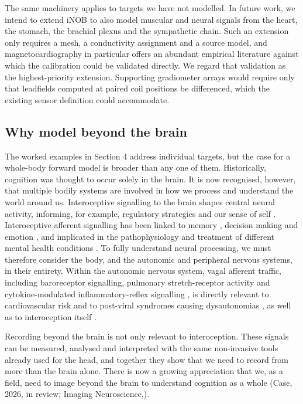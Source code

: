 \documentclass[11pt]{article}
\begin{document}
The same machinery applies to targets we have not modelled. In future
work, we intend to extend iNOB to also model muscular and neural signals
from the heart, the stomach, the brachial plexus and the sympathetic
chain. Such an extension only requires a mesh, a conductivity assignment
and a source model, and magnetocardiography in particular offers an
abundant empirical literature against which the calibration could be
validated directly. We regard that validation as the highest-priority
extension. Supporting gradiometer arrays would require only that
leadfields computed at paired coil positions be differenced, which the
existing sensor definition could accommodate.

\subsection{Why model beyond the
brain}\label{why-model-beyond-the-brain}

The worked examples in Section 4 address individual targets, but the
case for a whole-body forward model is broader than any one of them.
Historically, cognition was thought to occur solely in the brain. It is
now recognised, however, that multiple bodily systems are involved in
how we process and understand the world around us. Interoceptive
signalling to the brain shapes central neural activity, informing, for
example, regulatory strategies and our sense of self \citep{44, 18}.
Interoceptive afferent signalling has been linked to memory \citep{229},
decision making \citep{230} and emotion \citep{231, 232}, and implicated
in the pathophysiology and treatment of different mental health
conditions \citep{197}. To fully understand neural
processing, we must therefore consider the body, and the autonomic and
peripheral nervous systems, in their entirety. Within the autonomic
nervous system, vagal afferent traffic, including baroreceptor
signalling, pulmonary stretch-receptor activity and cytokine-modulated
inflammatory-reflex signalling \citep{179}, is directly relevant to
cardiovascular risk and to post-viral syndromes causing dysautonomias
\citep{198}, as well as to interoception itself \citep{194, 197}.

Recording beyond the brain is not only relevant to interoception. These
signals can be measured, analysed and interpreted with the same
non-invasive tools already used for the head, and together they show
that we need to record from more than the brain alone. There is now a
growing appreciation that we, as a field, need to image beyond the brain
to understand cognition as a whole (Case, 2026, in review; Imaging
Neuroscience,\citep{225, 194}).
\end{document}
